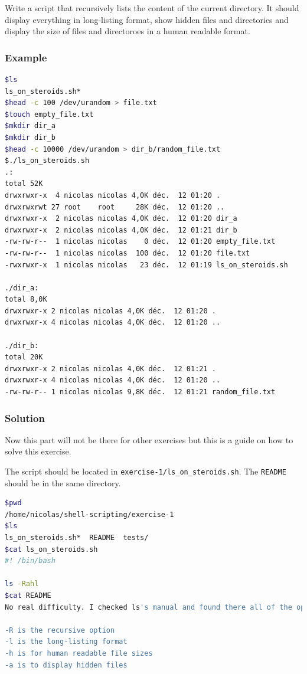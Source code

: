 \documentclass[12pt]{article}
\begin{document}
Write a script that recursively lists the content of the current directory. It should display everything in long-listing format, show hidden files and directories and display the size of files and directoroes in a human readable format.

\subsubsection{Example}

\begin{lstlisting}[language=bash]
$ls
ls_on_steroids.sh*
$head -c 100 /dev/urandom > file.txt
$touch empty_file.txt
$mkdir dir_a
$mkdir dir_b
$head -c 10000 /dev/urandom > dir_b/random_file.txt
$./ls_on_steroids.sh 
.:
total 52K
drwxrwxr-x  4 nicolas nicolas 4,0K déc.  12 01:20 .
drwxrwxrwt 27 root    root     28K déc.  12 01:20 ..
drwxrwxr-x  2 nicolas nicolas 4,0K déc.  12 01:20 dir_a
drwxrwxr-x  2 nicolas nicolas 4,0K déc.  12 01:21 dir_b
-rw-rw-r--  1 nicolas nicolas    0 déc.  12 01:20 empty_file.txt
-rw-rw-r--  1 nicolas nicolas  100 déc.  12 01:20 file.txt
-rwxrwxr-x  1 nicolas nicolas   23 déc.  12 01:19 ls_on_steroids.sh

./dir_a:
total 8,0K
drwxrwxr-x 2 nicolas nicolas 4,0K déc.  12 01:20 .
drwxrwxr-x 4 nicolas nicolas 4,0K déc.  12 01:20 ..

./dir_b:
total 20K
drwxrwxr-x 2 nicolas nicolas 4,0K déc.  12 01:21 .
drwxrwxr-x 4 nicolas nicolas 4,0K déc.  12 01:20 ..
-rw-rw-r-- 1 nicolas nicolas 9,8K déc.  12 01:21 random_file.txt
\end{lstlisting}

\subsubsection{Solution}

Now this part will not be there for other exercises but this is a guide on how to solve this exercise.

The script should be located in \texttt{exercise-1/ls\_on\_steroids.sh}. The \texttt{README} should be in the same directory.

\begin{lstlisting}[language=bash]
$pwd
/home/nicolas/shell-scripting/exercise-1
$ls
ls_on_steroids.sh*  README  tests/
$cat ls_on_steroids.sh 
#! /bin/bash

ls -Rahl
$cat README 
No real difficulty. I checked ls's manual and found there all of the options that I needed to use.

-R is the recursive option
-l is the long-listing format
-h is for human readable file sizes
-a is to display hidden files

\end{lstlisting}
\end{document}

